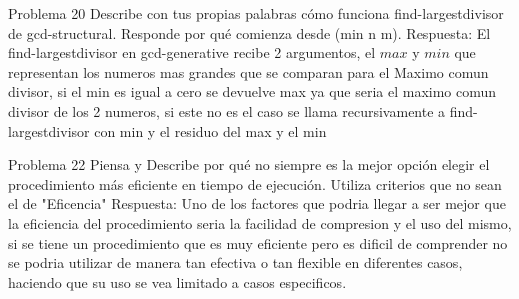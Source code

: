 \documentclass{article}
\begin{document}
    Problema 20 \newline 
    Describe con tus propias palabras cómo funciona find-largestdivisor de gcd-structural. Responde por qué comienza desde (min n m).\newline
    Respuesta: \newline
    El find-largestdivisor en gcd-generative recibe 2 argumentos, el $max$ y $min$ que representan los numeros mas grandes que se comparan para el Maximo comun divisor, si el min es igual a cero se devuelve max ya que seria el maximo comun divisor de los 2 numeros, si este no es el caso se llama recursivamente a find-largestdivisor con min y el residuo del max y el min

    Problema 22 \newline
    Piensa y Describe por qué no siempre es la mejor opción elegir el procedimiento más eficiente en tiempo de ejecución. Utiliza criterios que no sean el de "Eficencia"
    Respuesta: \newline
    Uno de los factores que podria llegar a ser mejor que la eficiencia del procedimiento seria la facilidad de compresion y el uso del mismo, si se tiene un procedimiento que es muy eficiente pero es dificil de comprender no se podria utilizar de manera tan efectiva o tan flexible en diferentes casos, haciendo que su uso se vea limitado a casos especificos.
\end{document}
